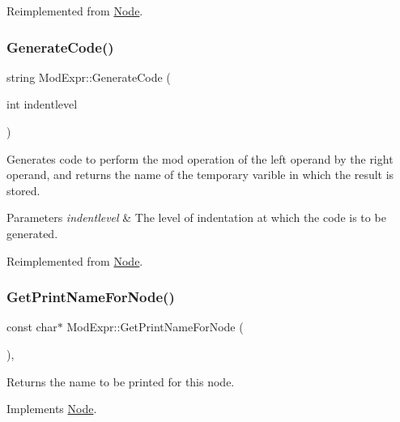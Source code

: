 Reimplemented from \hyperlink{class_node_a5f88d55c6f253a29def7ccc443d83d47}{Node}.

\mbox{\label{class_mod_expr_abb2f195af11f6f477b990e3d61e2dfb0}} 
\subsubsection{\texorpdfstring{Generate\+Code()}{GenerateCode()}}
{\footnotesize\ttfamily string Mod\+Expr\+::\+Generate\+Code (\begin{DoxyParamCaption}\item[{int}]{indentlevel }\end{DoxyParamCaption})\hspace{0.3cm}{\ttfamily [virtual]}}

Generates code to perform the mod operation of the left operand by the right operand, and returns the name of the temporary varible in which the result is stored. 
\begin{DoxyParams}{Parameters}
{\em indentlevel} & The level of indentation at which the code is to be generated. \\
\hline
\end{DoxyParams}


Reimplemented from \hyperlink{class_node_acb60e526730e8436056375a3055c2c32}{Node}.

\mbox{\label{class_mod_expr_a6e8f088ebc9429ae36cc6ae89c55588e}} 
\subsubsection{\texorpdfstring{Get\+Print\+Name\+For\+Node()}{GetPrintNameForNode()}}
{\footnotesize\ttfamily const char$\ast$ Mod\+Expr\+::\+Get\+Print\+Name\+For\+Node (\begin{DoxyParamCaption}{ }\end{DoxyParamCaption})\hspace{0.3cm}{\ttfamily [inline]}, {\ttfamily [virtual]}}

Returns the name to be printed for this node. 

Implements \hyperlink{class_node_a56e29657306ffb004d69c6929ae44269}{Node}.

